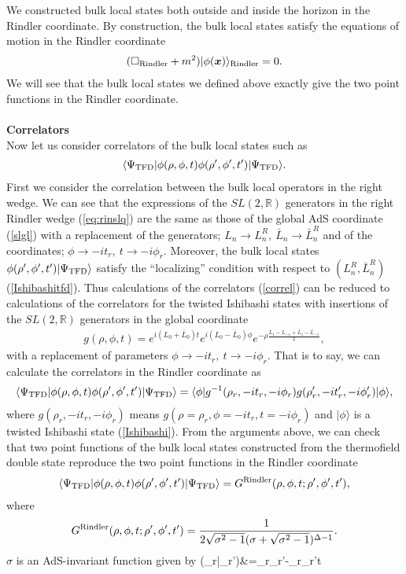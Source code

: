 \documentclass[11pt,a4paper]{article}
\def\s{\sqrt}
\def\ba{\begin{eqnarray}}
\def\ea{\end{eqnarray}}
\def\bal#1\eal{\begin{align}#1\end{align}}
\def\r{\rightarrow}
\def\f {\frac}
\def\no{\nonumber \\}
\def\la{\langle}
\def\lb{\rangle}
\def\r{\rightarrow}
\begin{document}
We constructed bulk local states both outside and inside the horizon in the Rindler coordinate.
By construction, the bulk local states satisfy the equations of motion in the Rindler coordinate
\ba
(\Box_{\rm Rindler}+m^2)|\phi(\boldsymbol{x})\lb_{\rm Rindler}=0.
\ea
We will see that the bulk local states we defined above exactly give the two point functions in the Rindler coordinate.
\\
\\
\textbf{Correlators}\\
Now let us consider correlators of the bulk local states such as
\ba
\la \Psi_{\rm TFD}|\phi(\rho,\phi,t)\phi(\rho',\phi',t')|\Psi_{\rm TFD}\lb.\label{correl}
\ea
First we consider the correlation between the bulk local operators in the right wedge. We can see that the expressions of the $SL(2,\mathbb{R})$ generators in the right Rindler wedge (\ref{eq:rinslq}) are the same as those of the global AdS coordinate (\ref{slgl}) with a replacement of the generators; $L_{n} \r L_{n}^R,\ \bar{L}_{n}\r \bar{L}_{n}^R$  and of the coordinates; $\phi\r -it_r,\ t\r -i\phi_r$.
Moreover, the bulk local states $\phi(\rho',\phi',t')|\Psi_{\rm TFD}\lb$ satisfy the ``localizing'' condition with respect to $(L_{n}^R,\bar{L}_{n}^R)$ (\ref{Ishibashitfd}). Thus calculations of the correlators (\ref{correl}) can be reduced to calculations of the correlators for the twisted Ishibashi states with insertions of the $SL(2,\mathbb{R})$ generators in the global coordinate
\ba
g(\rho,\phi,t)=e^{i(L_0+\bar{L}_0)t}e^{i(L_0-\bar{L}_0)\phi}e^{-
\rho\f{L_1-L_{-1}+\bar{L}_1-\bar{L}_{-1}}{2}},
\ea
with a 
replacement of parameters $\phi\r -it_r,\ t\r -i\phi_r$. That is to say, we can calculate the correlators in the Rindler coordinate as
\ba
\la \Psi_{\rm TFD}|\phi(\rho,\phi,t)\phi(\rho',\phi',t')|\Psi_{\rm TFD}\lb=\la \phi|g^{-1}(\rho_r,-it_r,-i\phi_r)g(\rho'_r,-it'_r,-i\phi'_r)|\phi\lb,\label{eqvt}
\ea
where $g(\rho_r,-it_r,-i\phi_r)$ means $g(\rho=\rho_r,\phi=-it_r,t=-i\phi_r)$ and $|\phi\lb$ is a twisted Ishibashi state (\ref{Ishibashi}). From the arguments above, we can check that two point functions of the bulk local states constructed from the thermofield double state reproduce the two point functions in the Rindler coordinate \cite{IS}
\ba
\la \Psi_{\rm TFD}|\phi(\rho,\phi,t)\phi(\rho',\phi',t')|\Psi_{\rm TFD}\lb=G^{\rm Rindler}(\rho,\phi,t;\rho',\phi',t'),\label{correl3}
\ea
where
\ba
G^{\rm Rindler}(\rho,\phi,t;\rho',\phi',t')=\f{1}{2\s{\sigma^2-1}(\sigma+\s{\sigma^2-1})^{\Delta-1}}.\label{correl4}
\ea
$\sigma$ is an AdS-invariant function given by
\bal
\sigma(_r|_r')&=\cosh\rho_r\cosh\rho_r'\cosh\Delta \phi-\sinh\rho_r\sinh\rho_r'\cosh\Delta t \no
\end{document}
